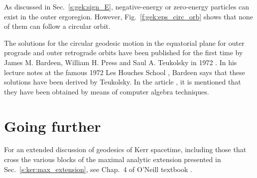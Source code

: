 \begin{remark}
As discussed in Sec.~\ref{s:gek:sign_E}, negative-energy or zero-energy particles can exist in
the outer ergoregion. However, Fig.~\ref{f:gek:eps_circ_orb} shows that none
of them can follow a circular orbit.
\end{remark}



\begin{hist}
The solutions for the circular geodesic motion in the equatorial plane
for outer prograde and outer retrograde orbits have been published for the first
time by James M. Bardeen, William H. Press and Saul A. Teukolsky in 1972 \cite{BardePT72}. In his lecture notes at the famous
1972 Les Houches School \cite{Barde73}, Bardeen says that these solutions have been derived by Teukolsky.
In the article \cite{BardePT72}, it is mentioned that they have been obtained by means of
computer algebra techniques.
\end{hist}



\section{Going further}

For an extended discussion of geodesics of Kerr spacetime, including those
that cross the various blocks of the maximal analytic extension presented in
Sec.~\ref{s:ker:max_extension}, see Chap.~4 of O'Neill textbook \cite{ONeil95}.


